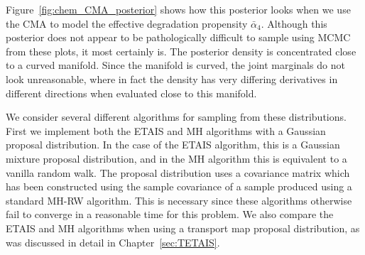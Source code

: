 \documentclass[final]{siamltex}
\newcommand\irregularcircle[2]{%
  \pgfextra {\pgfmathsetmacro\len{(#1)+rand*(#2)}}
  +(0:\len pt)
  \foreach \a in {10,20,...,350}{
    \pgfextra {\pgfmathsetmacro\len{(#1)+rand*(#2)}}
    -- +(\a:\len pt)
  } -- cycle
}
\begin{document}
Figure~\ref{fig:chem_CMA_posterior} shows how this posterior looks
when we use the CMA to model the effective degradation propensity
$\bar{\alpha}_4$. Although this posterior does not appear to be
pathologically difficult to sample using MCMC from these plots, it most certainly is. The posterior
density is concentrated close to a curved manifold. Since the manifold
is curved, the joint marginals do not look unreasonable, where in fact
the density has very differing derivatives in different directions
when evaluated close to this manifold.

We consider several different algorithms for sampling from these
distributions. First we implement both the ETAIS and MH algorithms with
a Gaussian proposal distribution. In the case of the ETAIS algorithm,
this is a Gaussian mixture proposal distribution, and in the MH
algorithm this is equivalent to a vanilla random walk. The proposal
distribution uses a covariance matrix which has been constructed using
the sample covariance of a sample produced using a standard MH-RW
algorithm. This is necessary since these algorithms otherwise fail to
converge in a reasonable time for
this problem. We also compare the ETAIS and MH algorithms when using a
transport map proposal distribution, as was discussed in detail in Chapter~\ref{sec:TETAIS}.








\end{document}
